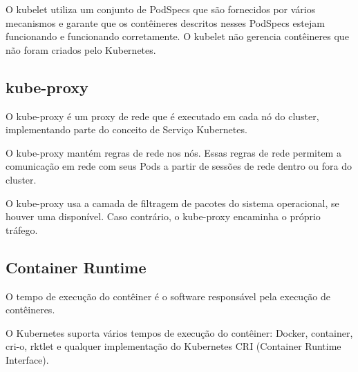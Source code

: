 O kubelet utiliza um conjunto de PodSpecs que são fornecidos por vários mecanismos e garante que os contêineres descritos nesses PodSpecs estejam funcionando e funcionando corretamente. O kubelet não gerencia contêineres que não foram criados pelo Kubernetes.

\subsection{kube-proxy}

O kube-proxy é um proxy de rede que é executado em cada nó do cluster, implementando parte do conceito de Serviço Kubernetes.

O kube-proxy mantém regras de rede nos nós. Essas regras de rede permitem a comunicação em rede com seus Pods a partir de sessões de rede dentro ou fora do cluster.

O kube-proxy usa a camada de filtragem de pacotes do sistema operacional, se houver uma disponível. Caso contrário, o kube-proxy encaminha o próprio tráfego.

\subsection{Container Runtime}

O tempo de execução do contêiner é o software responsável pela execução de contêineres.

O Kubernetes suporta vários tempos de execução do contêiner: Docker, container, cri-o, rktlet e qualquer implementação do Kubernetes CRI (Container Runtime Interface).